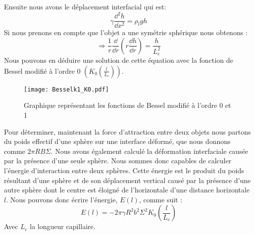          Ensuite nous avons le déplacement interfacial\cite{introfluidcambridge} qui est:
        \begin{equation}
            \gamma \frac{\dd^2h}{\dd x^2} = \rho_l g h
        \end{equation}
        Si nous prenons en compte que l'objet a une symétrie sphérique nous obtenons :
        \begin{equation}
            \Rightarrow \frac{1}{r} \frac{\dd}{\dd r} \left( r\frac{\dd h}{\dd r}\right) = \frac{h}{L_c^2}
        \end{equation}
        Nous pouvons en déduire une solution de cette équation avec la fonction de Bessel modifié à l'ordre 0 \cite{introbessel} $(K_0\left(\frac{l}{L_c}\right))$.

        \begin{figure}[H]
            \centering
            \texttt{[image: Besselk1\_K0.pdf]}
            \caption{Graphique représentant les fonctions de Bessel modifié à l'ordre 0 et 1}
            \label{fig:bessel}
        \end{figure}

        Pour déterminer, maintenant la force d'attraction entre deux objets nous partons du poids effectif d'une sphère sur une interface déformé, que nous donnons comme \(2\pi RB\Sigma\). Nous avons également calculé la déformation interfaciale causée
        par la présence d'une seule sphère. Nous sommes donc capables de calculer l'énergie d'interaction entre deux sphères. Cette énergie est le produit du poids résultant d'une sphère et de son déplacement vertical causé par la présence d'une autre sphère dont le centre est éloigné de l'horizontale d'une distance horizontale $l$. Nous pouvons donc écrire l'énergie, $E(l)$, comme suit :
        \begin{equation}
            E(l)=-2\pi\gamma R^2b^2\Sigma^2K_0\left(\frac{l}{L_c}\right)
            \label{eq:energyInteraction}
        \end{equation}
        Avec $L_c$ la longueur capillaire.

